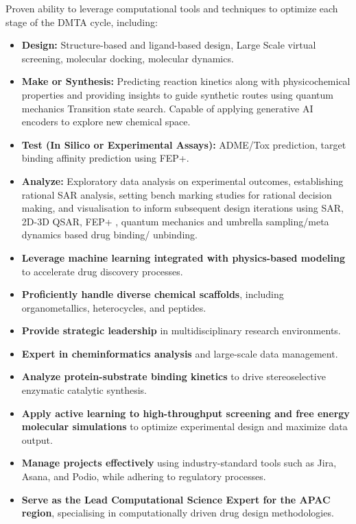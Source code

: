 \documentclass[10pt,a4paper,ragged2e,withhyper]{altacv}
\begin{document}
Proven ability to leverage computational tools and techniques to optimize each stage of the DMTA cycle, including:
\begin{itemize}
    \item \textbf{Design:} Structure-based and ligand-based design, Large Scale virtual screening, molecular docking, molecular dynamics.
    \item \textbf{ Make or Synthesis:} Predicting reaction kinetics along with physicochemical properties and providing insights to guide synthetic routes using quantum mechanics Transition state search. Capable of applying generative AI encoders to explore new chemical space.
    \item \textbf{Test (In Silico or Experimental Assays):} ADME/Tox prediction, target binding affinity prediction using FEP+.
    \item \textbf{Analyze:} Exploratory data analysis on experimental outcomes, establishing rational SAR analysis, setting bench marking studies for rational decision making, and visualisation to inform subsequent design iterations using SAR, 2D-3D QSAR, FEP+ , quantum mechanics and umbrella sampling/meta dynamics based drug binding/ unbinding.
\end{itemize}

\begin{itemize}
    \item \textbf{Leverage machine learning integrated with physics-based modeling} to accelerate drug discovery processes.
    \item \textbf{Proficiently handle diverse chemical scaffolds}, including organometallics, heterocycles, and peptides.
    \item \textbf{Provide strategic leadership} in multidisciplinary research environments.
    \item \textbf{Expert in cheminformatics analysis} and large-scale data management.
    \item \textbf{Analyze protein-substrate binding kinetics} to drive stereoselective enzymatic catalytic synthesis.
    \item \textbf{Apply active learning to high-throughput screening and free energy molecular simulations} to optimize experimental design and maximize data output.
    \item \textbf{Manage projects effectively} using industry-standard tools such as Jira, Asana, and Podio, while adhering to regulatory processes.
    \item \textbf{Serve as the Lead Computational Science Expert for the APAC region}, specialising in computationally driven drug design methodologies.
\end{itemize}
\end{document}
